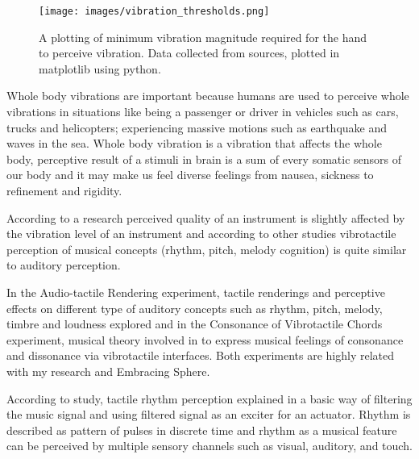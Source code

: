             \begin{figure}[H]
                \centering
                \texttt{[image: images/vibration\_thresholds.png]}
                \caption{A plotting of minimum vibration magnitude required for the hand to perceive vibration. Data collected from sources\cite{Haptic_Music}\cite{Haptic_Perception-A_Tutorial}\cite{Human_Response_to_Vibration}, plotted in matplotlib using python.}
                \label{fig:VIB_THRESHOLD}
            \end{figure}

            Whole body vibrations are important because humans are used to perceive whole vibrations in situations like being a passenger or driver in vehicles such as cars, trucks and helicopters; experiencing massive motions such as earthquake and waves in the sea\cite{Altinsoy_phd}. Whole body vibration is a vibration that affects the whole body, perceptive result of a stimuli in brain is a sum of every somatic sensors of our body\cite{Whole-Body_Vibration_Perception_Thresholds} and it may make us feel diverse feelings from nausea, sickness to refinement and rigidity\cite{Haptic_Perception-A_Tutorial}.\par 

            According to a research\cite{Perceived_Quality_with_Vibration_of_Electric_Cello} perceived quality of an instrument is slightly affected by the vibration level of an instrument and according to other studies\cite{Consonance_of_Vibrotactile_Chords}\cite{Audio-Tactile_Rendering} vibrotactile perception of musical concepts (rhythm, pitch, melody cognition) is quite similar to auditory perception.\par

            In the Audio-tactile Rendering experiment\cite{Audio-Tactile_Rendering}, tactile renderings and perceptive effects on different type of auditory concepts such as rhythm, pitch, melody, timbre and loudness explored and in the Consonance of Vibrotactile Chords experiment\cite{Consonance_of_Vibrotactile_Chords}, musical theory involved in to express musical feelings of consonance and dissonance via vibrotactile interfaces. Both experiments are highly related with my research and Embracing Sphere.

            According to study\cite{Audio-Tactile_Rendering}, tactile rhythm perception explained in a basic way of filtering the music signal and using filtered signal as an exciter for an actuator. Rhythm is described as pattern of pulses in discrete time and rhythm as a musical feature can be perceived by multiple sensory channels such as visual, auditory, and touch.\par

